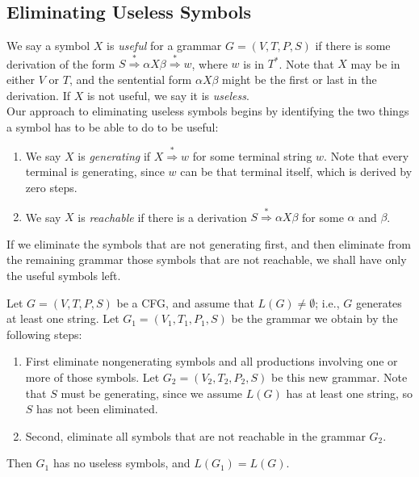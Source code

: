 \documentclass[]{article}
\begin{document}
  \subsection*{Eliminating Useless Symbols}
    We say a symbol $X$ is \emph{useful} for a grammar $G = (V,T,P,S)$ if there
    is some derivation of the form $S \overset{*}{\Rightarrow} \alpha{X}\beta
    \overset{*}{\Rightarrow} w$, where $w$ is in $T^*$. Note that $X$ may be in
    either $V$ or $T$, and the sentential form $\alpha{X}\beta$ might be the
    first or last in the derivation. If $X$ is not useful, we say it is
    \emph{useless}. \\
    \indent Our approach to eliminating useless symbols begins by identifying
    the two things a symbol has to be able to do to be useful:
      \begin{enumerate}
        \item We say $X$ is \emph{generating} if $X \overset{*}{\Rightarrow} w$
        for some terminal string $w$. Note that every terminal is generating,
        since $w$ can be that terminal itself, which is derived by zero steps.
        \item We say $X$ is \emph{reachable} if there is a derivation $S
        \overset{*}{\Rightarrow} \alpha{X}\beta$ for some $\alpha$ and $\beta$.
      \end{enumerate}
    If we eliminate the symbols that are not generating first, and then
    eliminate from the remaining grammar those symbols that are not reachable,
    we shall have only the useful symbols left.
      \begin{thm}
        Let $G = (V,T,P,S)$ be a CFG, and assume that $L(G) \neq \emptyset$;
        i.e., $G$ generates at least one string. Let $G_1 = (V_1,T_1,P_1,S)$ be
        the grammar we obtain by the following steps:
          \begin{enumerate}
            \item First eliminate nongenerating symbols and all productions
            involving one or more of those symbols. Let $G_2 = (V_2,T_2,P_2,S)$
            be this new grammar. Note that $S$ must be generating, since we
            assume $L(G)$ has at least one string, so $S$ has not been
            eliminated.
            \item Second, eliminate all symbols that are not reachable in the
            grammar $G_2$.
          \end{enumerate}
        Then $G_1$ has no useless symbols, and $L(G_1) = L(G)$.
      \end{thm}
\end{document}

